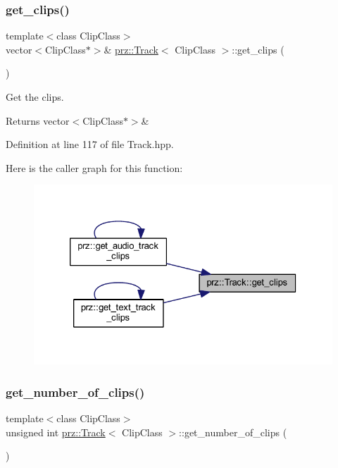 \subsubsection{\texorpdfstring{get\_clips()}{get\_clips()}}
{\footnotesize\ttfamily template$<$class Clip\+Class$>$ \\
vector$<$Clip\+Class$\ast$$>$\& \mbox{\hyperlink{classprz_1_1_track}{prz\+::\+Track}}$<$ Clip\+Class $>$\+::get\+\_\+clips (\begin{DoxyParamCaption}{ }\end{DoxyParamCaption})\hspace{0.3cm}{\ttfamily [inline]}}



Get the clips. 

\begin{DoxyReturn}{Returns}
vector$<$\+Clip\+Class$\ast$$>$\& 
\end{DoxyReturn}


Definition at line 117 of file Track.\+hpp.

Here is the caller graph for this function\+:
\nopagebreak
\begin{figure}[H]
\begin{center}
\leavevmode
\includegraphics[width=326pt]{classprz_1_1_track_a54eb44634d26680f1851077e64991419_icgraph}
\end{center}
\end{figure}
\mbox{\label{classprz_1_1_track_a776b6d37978d945f406fc4922981a2a1}} 
\subsubsection{\texorpdfstring{get\_number\_of\_clips()}{get\_number\_of\_clips()}}
{\footnotesize\ttfamily template$<$class Clip\+Class$>$ \\
unsigned int \mbox{\hyperlink{classprz_1_1_track}{prz\+::\+Track}}$<$ Clip\+Class $>$\+::get\+\_\+number\+\_\+of\+\_\+clips (\begin{DoxyParamCaption}{ }\end{DoxyParamCaption})\hspace{0.3cm}{\ttfamily [inline]}}



